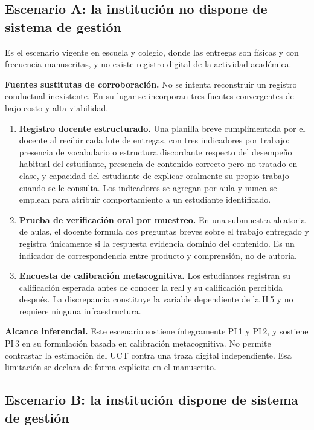 \documentclass[11pt,a4paper]{article}
\begin{document}
\subsection{Escenario A: la institución no dispone de sistema de gestión}

Es el escenario vigente en escuela y colegio, donde las entregas son físicas y con frecuencia manuscritas, y no existe registro digital de la actividad académica.

\textbf{Fuentes sustitutas de corroboración.} No se intenta reconstruir un registro conductual inexistente. En su lugar se incorporan tres fuentes convergentes de bajo costo y alta viabilidad.

\begin{enumerate}[leftmargin=1.4em,itemsep=0.4em]
	\item \textbf{Registro docente estructurado.} Una planilla breve cumplimentada por el docente al recibir cada lote de entregas, con tres indicadores por trabajo: presencia de vocabulario o estructura discordante respecto del desempeño habitual del estudiante, presencia de contenido correcto pero no tratado en clase, y capacidad del estudiante de explicar oralmente su propio trabajo cuando se le consulta. Los indicadores se agregan por aula y nunca se emplean para atribuir comportamiento a un estudiante identificado.
	\item \textbf{Prueba de verificación oral por muestreo.} En una submuestra aleatoria de aulas, el docente formula dos preguntas breves sobre el trabajo entregado y registra únicamente si la respuesta evidencia dominio del contenido. Es un indicador de correspondencia entre producto y comprensión, no de autoría.
	\item \textbf{Encuesta de calibración metacognitiva.} Los estudiantes registran su calificación esperada antes de conocer la real y su calificación percibida después. La discrepancia constituye la variable dependiente de la H\,5 y no requiere ninguna infraestructura.
\end{enumerate}

\textbf{Alcance inferencial.} Este escenario sostiene íntegramente PI\,1 y PI\,2, y sostiene PI\,3 en su formulación basada en calibración metacognitiva. No permite contrastar la estimación del UCT contra una traza digital independiente. Esa limitación se declara de forma explícita en el manuscrito.

\subsection{Escenario B: la institución dispone de sistema de gestión}
\end{document}
